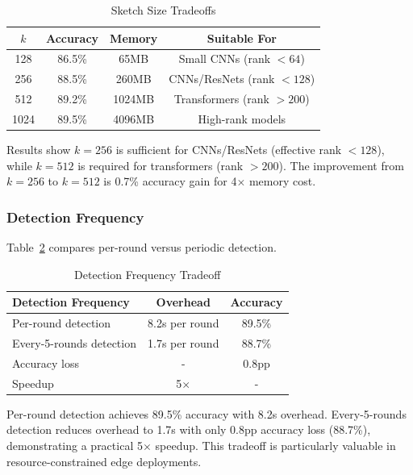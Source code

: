 \documentclass[runningheads]{llncs}
\begin{document}
\begin{table}[htbp]
\centering
\caption{Sketch Size Tradeoffs}
\label{tab:sketch_size_detail}
\begin{tabular}{|c|c|c|c|}
\hline
\textbf{$k$} & \textbf{Accuracy} & \textbf{Memory} & \textbf{Suitable For} \\
\hline
128 & 86.5\% & 65MB & Small CNNs (rank $<64$) \\
256 & 88.5\% & 260MB & CNNs/ResNets (rank $<128$) \\
512 & 89.2\% & 1024MB & Transformers (rank $>200$) \\
1024 & 89.5\% & 4096MB & High-rank models \\
\hline
\end{tabular}
\end{table}

Results show $k=256$ is sufficient for CNNs/ResNets (effective rank $<128$), while $k=512$ is required for transformers (rank $>200$). The improvement from $k=256$ to $k=512$ is 0.7\% accuracy gain for 4$\times$ memory cost.

\subsubsection{Detection Frequency}

Table~\ref{tab:detection_frequency} compares per-round versus periodic detection.

\begin{table}[htbp]
\centering
\caption{Detection Frequency Tradeoff}
\label{tab:detection_frequency}
\begin{tabular}{|l|c|c|}
\hline
\textbf{Detection Frequency} & \textbf{Overhead} & \textbf{Accuracy} \\
\hline
Per-round detection & 8.2s per round & 89.5\% \\
Every-5-rounds detection & 1.7s per round & 88.7\% \\
\hline
Accuracy loss & - & 0.8pp \\
Speedup & 5$\times$ & - \\
\hline
\end{tabular}
\end{table}

Per-round detection achieves 89.5\% accuracy with 8.2s overhead. Every-5-rounds detection reduces overhead to 1.7s with only 0.8pp accuracy loss (88.7\%), demonstrating a practical 5$\times$ speedup. This tradeoff is particularly valuable in resource-constrained edge deployments.
\end{document}
